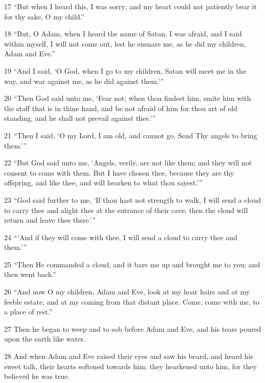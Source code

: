 \par 17 “But when I heard this, I was sorry; and my heart could not patiently bear it for thy sake, O my child.”

\par 18 “But, O Adam, when I heard the name of Satan, I was afraid, and I said within myself, I will not come out, lest he ensnare me, as he did my children, Adam and Eve.”

\par 19 “And I said, ‘O God, when I go to my children, Satan will meet me in the way, and war against me, as he did against them.’”

\par 20 “Then God said unto me, ‘Fear not; when thou findest him, smite him with the staff that is in thine hand, and be not afraid of him for thou art of old standing, and he shall not prevail against thee.’”

\par 21 “Then I said, ‘O my Lord, I am old, and cannot go. Send Thy angels to bring them.’”

\par 22 “But God said unto me, ‘Angels, verily, are not like them; and they will not consent to come with them. But I have chosen thee, because they are thy offspring, and like thee, and will hearken to what thou sayest.’”

\par 23 “God said further to me, ‘If thou hast not strength to walk, I will send a cloud to carry thee and alight thee at the entrance of their cave; then the cloud will return and leave thee there.’”

\par 24 “‘And if they will come with thee, I will send a cloud to carry thee and them.’”

\par 25 “Then He commanded a cloud, and it bare me up and brought me to you; and then went back.”

\par 26 “And now O my children, Adam and Eve, look at my hoar hairs and at my feeble estate, and at my coming from that distant place. Come, come with me, to a place of rest.”

\par 27 Then he began to weep and to sob before Adam and Eve, and his tears poured upon the earth like water.

\par 28 And when Adam and Eve raised their eyes and saw his beard, and heard his sweet talk, their hearts softened towards him; they hearkened unto him, for they believed he was true.

